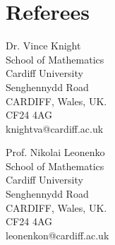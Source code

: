 \documentclass[a4paper]{article}
\begin{document}
\section{Referees}

\begin{minipage}[b]{0.5\linewidth}
Dr. Vince Knight\\
School of Mathematics\\
Cardiff University\\
Senghennydd Road\\
CARDIFF, Wales, UK.\\
CF24 4AG\\
knightva@cardiff.ac.uk
\end{minipage}
%
%
\begin{minipage}[b]{0.5\linewidth}
Prof. Nikolai Leonenko\\
School of Mathematics\\
Cardiff University\\
Senghennydd Road\\
CARDIFF, Wales, UK.\\
CF24 4AG\\
leonenkon@cardiff.ac.uk
\end{minipage}






\end{document}
